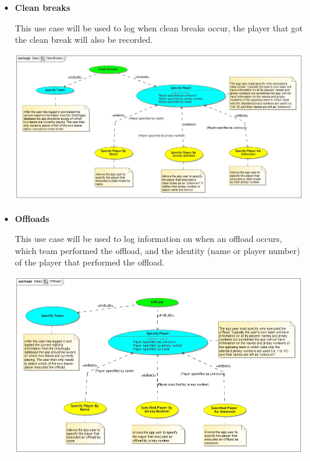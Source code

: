 \documentclass[a4paper,12pt]{report}
\begin{document}
\begin{itemize}
\begin{center}
		\end{center}
	\item \textbf{Clean breaks}
		\begin{flushleft}
		This use case will be used to log when clean breaks occur, the player that got the clean break will also be recorded.
		\end{flushleft}
		\begin{center}
		\includegraphics[width=1\textwidth]{./Diagrams/CleanBreaks.jpg}\\[0.4cm]
		\end{center}
	\item \textbf{Offloads}
		\begin{flushleft}
		This use case will be used to log information on when an offload occurs, which team performed the offload, and the identity (name or player number) of the player that performed the offload.
		\end{flushleft}
		\begin{center}
		\includegraphics[width=1\textwidth]{./Diagrams/Offload.jpg}\\[0.4cm]
		\end{center}

\end{itemize}
\end{document}

